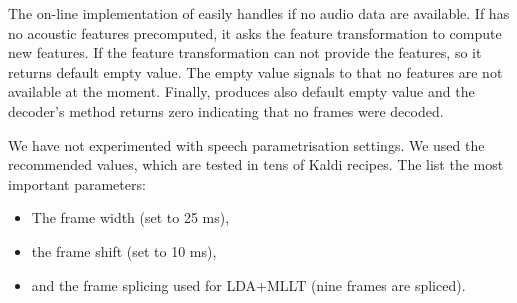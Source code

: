 The on-line implementation  of  easily handles if no audio data are available.
If  has no acoustic features precomputed, it asks the feature transformation to compute new features.
If the feature transformation can not provide the features, so it returns default empty value. 
The empty value signals to  that no features are not available at the moment. 
Finally,  produces also default empty value and the decoder's method  returns zero indicating that no frames were decoded.

We have not experimented with speech parametrisation settings. 
We used the recommended values, which are tested in tens of Kaldi recipes.
The list the most important parameters:
\begin{itemize}
    \item The frame width (set to 25 ms), 
    \item the frame shift (set to 10 ms), 
    \item and the frame splicing used for \ac{LDA}+\ac{MLLT} (nine frames are spliced).
\end{itemize}



